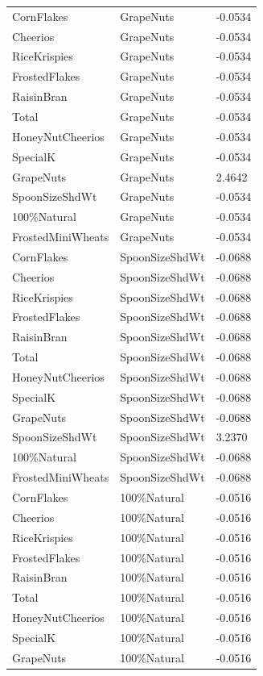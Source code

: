 \begin{table}[!htbp]
\begin{tabular}{lll}
CornFlakes & GrapeNuts & -0.0534
\\
Cheerios & GrapeNuts & -0.0534
\\
RiceKrispies & GrapeNuts & -0.0534
\\
FrostedFlakes & GrapeNuts & -0.0534
\\
RaisinBran & GrapeNuts & -0.0534
\\
Total & GrapeNuts & -0.0534
\\
HoneyNutCheerios & GrapeNuts & -0.0534
\\
SpecialK & GrapeNuts & -0.0534
\\
GrapeNuts & GrapeNuts & 2.4642
\\
SpoonSizeShdWt & GrapeNuts & -0.0534
\\
100\%Natural & GrapeNuts & -0.0534
\\
FrostedMiniWheats & GrapeNuts & -0.0534
\\
CornFlakes & SpoonSizeShdWt & -0.0688
\\
Cheerios & SpoonSizeShdWt & -0.0688
\\
RiceKrispies & SpoonSizeShdWt & -0.0688
\\
FrostedFlakes & SpoonSizeShdWt & -0.0688
\\
RaisinBran & SpoonSizeShdWt & -0.0688
\\
Total & SpoonSizeShdWt & -0.0688
\\
HoneyNutCheerios & SpoonSizeShdWt & -0.0688
\\
SpecialK & SpoonSizeShdWt & -0.0688
\\
GrapeNuts & SpoonSizeShdWt & -0.0688
\\
SpoonSizeShdWt & SpoonSizeShdWt & 3.2370
\\
100\%Natural & SpoonSizeShdWt & -0.0688
\\
FrostedMiniWheats & SpoonSizeShdWt & -0.0688
\\
CornFlakes & 100\%Natural & -0.0516
\\
Cheerios & 100\%Natural & -0.0516
\\
RiceKrispies & 100\%Natural & -0.0516
\\
FrostedFlakes & 100\%Natural & -0.0516
\\
RaisinBran & 100\%Natural & -0.0516
\\
Total & 100\%Natural & -0.0516
\\
HoneyNutCheerios & 100\%Natural & -0.0516
\\
SpecialK & 100\%Natural & -0.0516
\\
GrapeNuts & 100\%Natural & -0.0516
\\

\end{tabular}
\end{table}
